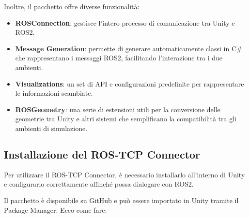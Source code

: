 \documentclass[11pt]{report}
\begin{document}
Inoltre, il pacchetto offre diverse funzionalità:

\begin{itemize}
    \item \textbf{ROSConnection}: gestisce l’intero processo di comunicazione tra Unity e ROS2.
    \item \textbf{Message Generation}: permette di generare automaticamente classi in C\# che rappresentano i messaggi ROS2, facilitando l’interazione tra i due ambienti.
    \item \textbf{Visualizations}: un set di API e configurazioni predefinite per rappresentare le informazioni scambiate.
    \item \textbf{ROSGeometry}: una serie di estensioni utili per la conversione delle geometrie tra Unity e altri sistemi che semplificano la compatibilità tra gli ambienti di simulazione.
\end{itemize}

\subsection*{\textbf{Installazione del ROS-TCP Connector}}

Per utilizzare il ROS-TCP Connector, è necessario installarlo all’interno di Unity e configurarlo correttamente affinché possa dialogare con ROS2.

Il pacchetto è disponibile su GitHub e può essere importato in Unity tramite il Package Manager. Ecco come fare:
\end{document}
